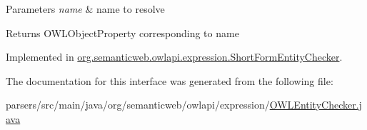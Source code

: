 \begin{DoxyParams}{Parameters}
{\em name} & name to resolve \\
\hline
\end{DoxyParams}
\begin{DoxyReturn}{Returns}
O\-W\-L\-Object\-Property corresponding to name 
\end{DoxyReturn}


Implemented in \hyperlink{classorg_1_1semanticweb_1_1owlapi_1_1expression_1_1_short_form_entity_checker_ab62c783ba1929e555758743cc35733cf}{org.\-semanticweb.\-owlapi.\-expression.\-Short\-Form\-Entity\-Checker}.



The documentation for this interface was generated from the following file\-:\begin{DoxyCompactItemize}
\item 
parsers/src/main/java/org/semanticweb/owlapi/expression/\hyperlink{_o_w_l_entity_checker_8java}{O\-W\-L\-Entity\-Checker.\-java}\end{DoxyCompactItemize}
